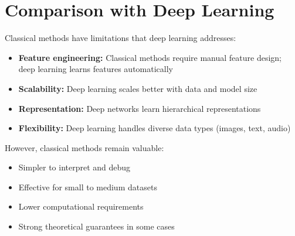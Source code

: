 \section{Comparison with Deep Learning}
\label{sec:comparison}

Classical methods have limitations that deep learning addresses:

\begin{itemize}
    \item \textbf{Feature engineering:} Classical methods require manual feature design; deep learning learns features automatically
    \item \textbf{Scalability:} Deep learning scales better with data and model size
    \item \textbf{Representation:} Deep networks learn hierarchical representations
    \item \textbf{Flexibility:} Deep learning handles diverse data types (images, text, audio)
\end{itemize}

However, classical methods remain valuable:
\begin{itemize}
    \item Simpler to interpret and debug
    \item Effective for small to medium datasets
    \item Lower computational requirements
    \item Strong theoretical guarantees in some cases
\end{itemize}
